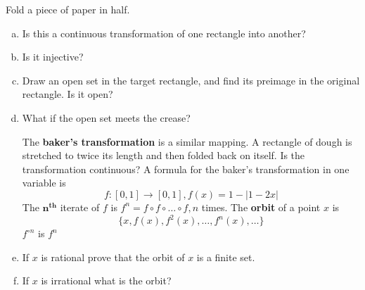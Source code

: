 \documentclass[a4paper, 12pt]{article}
\begin{document}
\begin{problem} [2.117 f]
Fold a piece of paper in half.
\begin{enumerate} [(a)]
    \item Is this a continuous transformation of one rectangle into another?
    \item Is it injective?
    \item Draw an open set in the target rectangle, and find its preimage in the original rectangle. Is it open?
    \item What if the open set meets the crease?

          The \textbf{baker's transformation} is a similar mapping. A rectangle of dough is stretched to twice its length and then folded back on itself. Is the transformation continuous? A formula for the baker's transformation in one variable is \[
              f: [0, 1] \to [0, 1], f(x) = 1 - |1 - 2x|
          \]
          The $\mathbf{n^{th}}$ iterate of $f$ is $f^n = f \circ f \circ \dots \circ f, n$ times. The \textbf{orbit} of a point $x$ is \[
              \{x, f(x), f^2(x), \dots, f^n(x), \dots\}
          \]
          $f^{\circ n}$ is $f^n$
    \item If $x$ is rational prove that the orbit of $x$ is a finite set.
    \item If $x$ is irrational what is the orbit?
\end{enumerate}
\end{problem}
\end{document}
